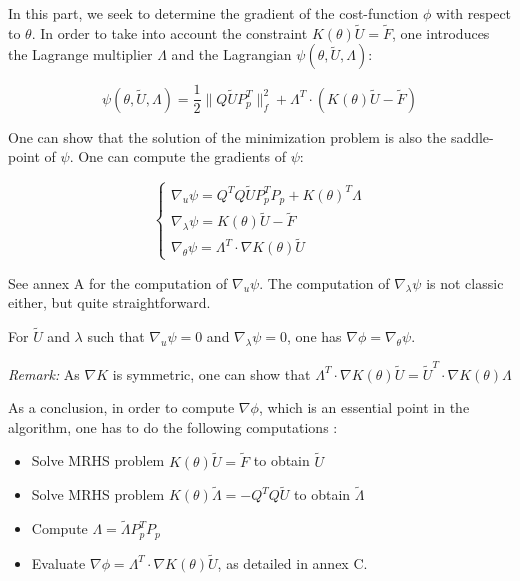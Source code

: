 \documentclass[11pt,a4paper]{article}		%
\begin{document}
In this part, we seek to determine the gradient of the cost-function $\phi$ with respect to $\theta$. In order to take into account the constraint $K(\theta)\tilde{U} = \tilde{F}$, one introduces the Lagrange multiplier $\Lambda$ and the Lagrangian $\psi(\theta,\tilde{U},\Lambda)$:

\begin{equation}
\psi(\theta,\tilde{U},\Lambda) = \dfrac{1}{2} \|Q\tilde{U}P_p^T\|_f^2 + \Lambda^T \cdot \left( K(\theta)\tilde{U} - \tilde{F} \right)
\end{equation}

One can show that the solution of the minimization problem is also the saddle-point of $\psi$. One can compute the gradients of $\psi$:

\begin{equation}
\begin{cases}
\nabla_u \psi = Q^TQ\tilde{U}P_p^TP_p + K(\theta)^T \Lambda \\
\nabla_\lambda \psi = K(\theta)\tilde{U} - \tilde{F} \\
\nabla_\theta \psi = \Lambda^T \cdot \nabla K(\theta) \tilde{U}
\end{cases}
\end{equation}

See annex A for the computation of $\nabla_u \psi$. The computation of $\nabla_\lambda \psi$ is not classic either, but quite straightforward.

For $\tilde{U}$ and $\lambda$ such that $\nabla_u \psi = 0$ and $\nabla_\lambda \psi = 0$, one has $\nabla\phi = \nabla_\theta \psi$.

\textit{Remark:} As $\nabla K$ is symmetric, one can show that $\Lambda^T \cdot \nabla K(\theta) \tilde{U} = \tilde{U}^T \cdot \nabla K(\theta) \Lambda$

As a conclusion, in order to compute $\nabla\phi$, which is an essential point in the algorithm, one has to do the following computations :

\begin{itemize}
	\item Solve MRHS problem $K(\theta)\tilde{U} = \tilde{F}$ to obtain $\tilde{U}$
	\item Solve MRHS problem $K(\theta) \tilde{\Lambda} = - Q^TQ\tilde{U}$ to obtain $\tilde{\Lambda}$
	\item Compute $\Lambda = \tilde{\Lambda}P_p^TP_p$
	\item Evaluate $\nabla\phi = \Lambda^T \cdot \nabla K(\theta) \tilde{U}$, as detailed in annex C.
\end{itemize}
\end{document}
